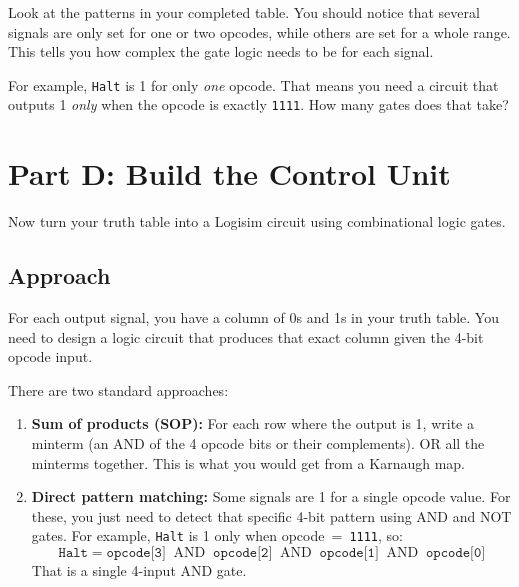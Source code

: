 \documentclass[11pt,a4paper]{article}
\newcommand{\opcode}[1]{\texttt{#1}}
\newcommand{\flag}[1]{\texttt{#1}}
\begin{document}
\begin{hintbox}
Look at the patterns in your completed table.
You should notice that several signals are only set for one or two opcodes, while others are set for a whole range.
This tells you how complex the gate logic needs to be for each signal.

\medskip
For example, \flag{Halt} is 1 for only \emph{one} opcode. That means you need a circuit that outputs 1 \emph{only} when the opcode is exactly \opcode{1111}.
How many gates does that take?
\end{hintbox}


\section{Part D: Build the Control Unit}

Now turn your truth table into a Logisim circuit using combinational logic gates.

\subsection{Approach}

For each output signal, you have a column of 0s and 1s in your truth table.
You need to design a logic circuit that produces that exact column given the 4-bit opcode input.

\medskip
\noindent There are two standard approaches:

\begin{enumerate}[leftmargin=2em]
  \item \textbf{Sum of products (SOP):} For each row where the output is 1, write a minterm (an AND of the 4 opcode bits or their complements). OR all the minterms together.
  This is what you would get from a Karnaugh map.

  \item \textbf{Direct pattern matching:} Some signals are 1 for a single opcode value.
  For these, you just need to detect that specific 4-bit pattern using AND and NOT gates.
  For example, \flag{Halt} is 1 only when opcode~=~\opcode{1111}, so:
  \[
    \flag{Halt} = \texttt{opcode[3]} \;\mathbin{\text{AND}}\; \texttt{opcode[2]} \;\mathbin{\text{AND}}\; \texttt{opcode[1]} \;\mathbin{\text{AND}}\; \texttt{opcode[0]}
  \]
  That is a single 4-input AND gate.
\end{enumerate}
\end{document}
